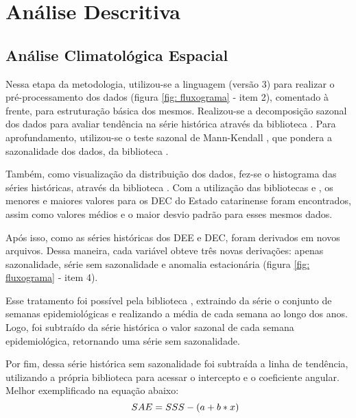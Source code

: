 \section{Análise Descritiva}

\subsection{Análise Climatológica Espacial}

\indent Nessa etapa da metodologia, utilizou-se a linguagem  (versão 3) \cite{python3_2009_van} para realizar o pré-processamento dos dados (figura \ref{fig: fluxograma} - item 2), comentado à frente, para estruturação básica dos mesmos. Realizou-se a decomposição sazonal dos dados para avaliar tendência na série histórica através da biblioteca  \cite{statsmodels_2010_seabold}. Para aprofundamento, utilizou-se o teste sazonal de Mann-Kendall , que pondera a sazonalidade dos dados, da biblioteca  \cite{pyMannKendall_2019_Hussain}.

\indent Também, como visualização da distribuição dos dados, fez-se o histograma das séries históricas, através da biblioteca  \cite{matplotlib_2007_hunter}. Com a utilização das bibliotecas  \cite{pandas_2010_scipy, pandas_2020_reback} e  \cite{numpy_2020_harrisarray}, os menores e maiores valores para os \acrshort{DEC} do Estado catarinense foram encontrados, assim como valores médios e o maior desvio padrão para esses mesmos dados.

\indent Após isso, como as séries históricas dos \acrshort{DEE} e \acrshort{DEC}, foram derivados em novos arquivos. Dessa maneira, cada variável obteve três novas derivações: apenas sazonalidade, série sem sazonalidade e anomalia estacionária (figura \ref{fig: fluxograma} - item 4). 

\indent Esse tratamento foi possível pela biblioteca , extraindo da série o conjunto de semanas epidemiológicas e realizando a média de cada semana ao longo dos anos. Logo, foi subtraído da série histórica o valor sazonal de cada semana epidemiológica, retornando uma série sem sazonalidade.

\indent Por fim, dessa série histórica sem sazonalidade foi subtraída a linha de tendência, utilizando a própria biblioteca   para acessar o intercepto e o coeficiente angular. Melhor exemplificado na equação abaixo:
\begin{equation}
\indent SAE = SSS - ( a + b * x )
\end{equation}

